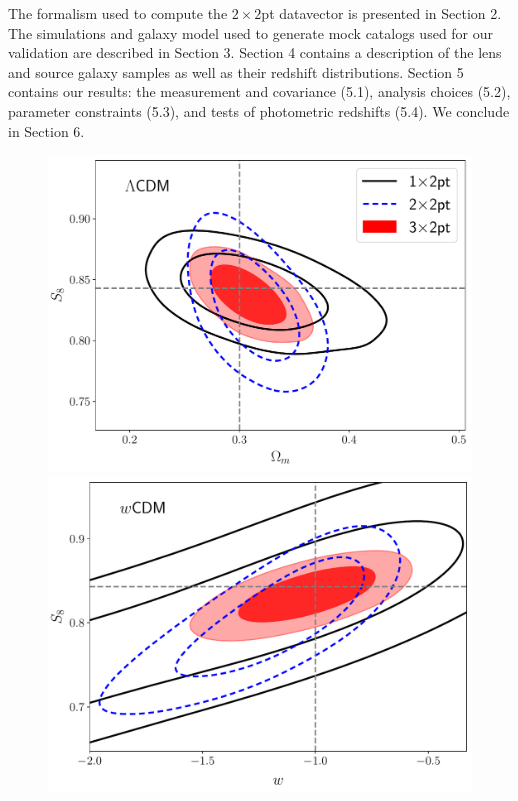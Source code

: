 \documentclass[aps, prd,twocolumn,superscriptaddress,nofootinbib,preprintnumbers]{revtex4-1}
\newcommand{\blue}[1]{\textcolor{blue}{#1}}
\begin{document}



The formalism used to compute the $2\times2$pt datavector is presented in Section 2. The simulations and galaxy model used to generate mock catalogs used for our validation are described in Section 3.  Section 4 contains a description of the lens and source galaxy samples as well as their redshift distributions. Section 5 contains our results: the measurement and covariance (5.1), analysis choices (5.2), parameter constraints (5.3), and tests of photometric redshifts (5.4). We conclude in Section 6.  

\begin{figure}
\includegraphics[width=\columnwidth]{figs/simulated_lcdm_compare.pdf}
\includegraphics[width=\columnwidth]{figs/simulated_wcdm_compare.pdf}

\end{figure}
\end{document}
